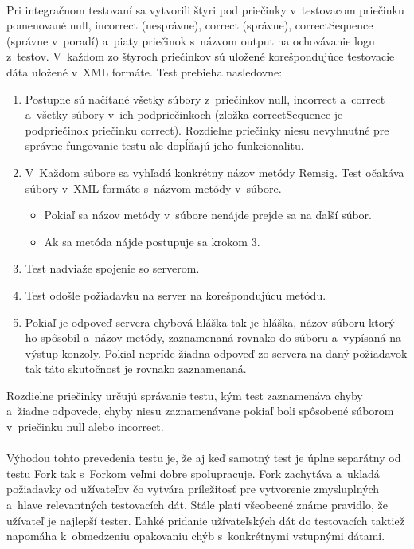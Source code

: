 \documentclass[
  digital, %
  table,   %
oneside,
  nolof,     %
  nolot,     %
]{fithesis3}
\begin{document}
 \paragraph{}
Pri integračnom testovaní sa  vytvorili štyri pod priečinky  v~testovacom priečinku pomenované null, incorrect (nesprávne), correct (správne), correctSequence (správne v~poradí) a~piaty priečinok s~názvom output na ochovávanie logu z~testov. V~každom zo štyroch priečinkov sú uložené korešpondujúce testovacie dáta uložené v~XML formáte. Test prebieha nasledovne: 
\begin{enumerate}
	\item Postupne sú načítané všetky súbory z~priečinkov null, incorrect a~correct a~všetky súbory v~ich podpriečinkoch (zložka correctSequence je podpriečinok priečinku correct). Rozdielne priečinky niesu nevyhnutné pre správne fungovanie testu ale dopĺňajú jeho funkcionalitu. 
	\item V~Každom súbore sa vyhľadá konkrétny názov metódy Remsig. Test očakáva súbory v~XML formáte s~názvom metódy v~súbore.
	\begin{itemize}
		\item Pokiaľ sa názov metódy v~súbore nenájde prejde sa na ďalší súbor.
		\item Ak sa metóda nájde postupuje sa krokom 3.
	\end{itemize}
	\item Test nadviaže spojenie so serverom.
	\item Test odošle požiadavku na server na korešpondujúcu metódu.
	\item Pokiaľ je odpoveď servera chybová hláška  tak je hláška, názov súboru ktorý ho spôsobil a~názov metódy, zaznamenaná rovnako do súboru a~vypísaná na výstup konzoly. Pokiaľ nepríde žiadna odpoveď zo servera na daný požiadavok tak táto skutočnosť je rovnako zaznamenaná.  

\end{enumerate}
Rozdielne priečinky určujú správanie testu, kým test zaznamenáva chyby a~žiadne odpovede, chyby niesu zaznamenávane pokiaľ boli spôsobené súborom v~priečinku null alebo incorrect.
\paragraph{}
Výhodou tohto prevedenia testu je, že aj keď samotný test je úplne separátny od testu Fork tak s~Forkom veľmi dobre spolupracuje. Fork zachytáva a~ukladá požiadavky od užívateľov čo vytvára príležitosť pre vytvorenie zmysluplných a~hlave relevantných testovacích dát. Stále platí všeobecné známe pravidlo, že užívateľ je najlepší tester. Ľahké pridanie užívateľských dát do testovacích taktiež napomáha k~obmedzeniu opakovaniu chýb s~konkrétnymi vstupnými dátami.      
\end{document}

